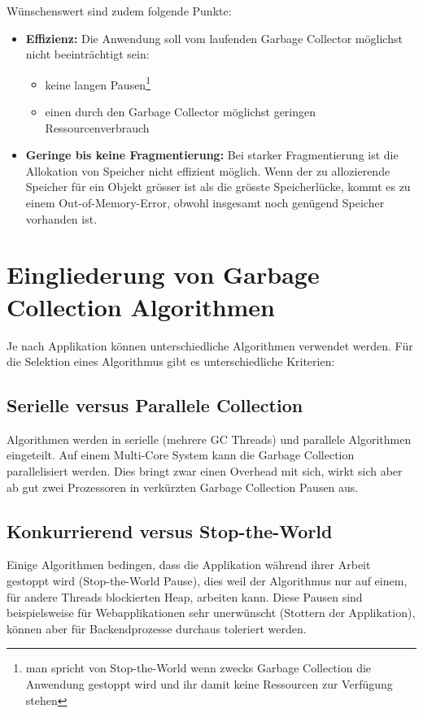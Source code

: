 Wünschenswert sind zudem folgende Punkte\cite[S. 4]{sunMemoryManagementWP}:
\begin{itemize}
	\item \textbf{Effizienz:} Die Anwendung soll vom laufenden Garbage Collector möglichst nicht beeinträchtigt sein: 
		\begin{itemize}
			\item keine langen Pausen\footnote{man spricht von Stop-the-World wenn zwecks Garbage Collection die Anwendung gestoppt wird und ihr damit keine Ressourcen zur Verfügung stehen}
			\item einen durch den Garbage Collector möglichst geringen Ressourcenverbrauch
		\end{itemize}
	\item \textbf{Geringe bis keine Fragmentierung:} Bei starker Fragmentierung ist die Allokation von Speicher nicht effizient möglich. Wenn der zu allozierende Speicher für ein Objekt grösser ist als die grösste Speicherlücke, kommt es zu einem Out-of-Memory-Error, obwohl insgesamt noch genügend Speicher vorhanden ist. 
\end{itemize}

\section{Eingliederung von Garbage Collection Algorithmen}
Je nach Applikation können unterschiedliche Algorithmen verwendet werden. Für die Selektion eines Algorithmus gibt es unterschiedliche Kriterien\cite[S. 5]{sunMemoryManagementWP}:
\subsection{Serielle versus Parallele Collection}
Algorithmen werden in serielle (mehrere GC Threads) und parallele Algorithmen eingeteilt.
Auf einem Multi-Core System kann die Garbage Collection parallelisiert werden. Dies bringt zwar einen Overhead mit sich, wirkt sich aber ab gut zwei Prozessoren in verkürzten Garbage Collection Pausen aus.

\subsection{Konkurrierend versus Stop-the-World}
Einige Algorithmen bedingen, dass die Applikation während ihrer Arbeit gestoppt wird (Stop-the-World Pause), dies weil der Algorithmus nur auf einem, für andere Threads blockierten Heap, arbeiten kann. Diese Pausen sind beispielsweise für Webapplikationen sehr unerwünscht (Stottern der Applikation), können aber für Backendprozesse durchaus toleriert werden.


